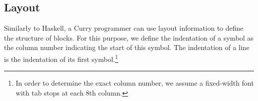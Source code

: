 \begin{grammar}







\end{grammar}

\subsection{Layout}
Similarly to Haskell, a Curry programmer can use layout information
to define the structure of blocks. For this purpose, we define
the indentation of a symbol as the column number indicating
the start of this symbol. The indentation of a line is the
indentation of its first symbol.\footnote{In order to determine
the exact column number, we assume a fixed-width font with
tab stops at each 8th column.}

